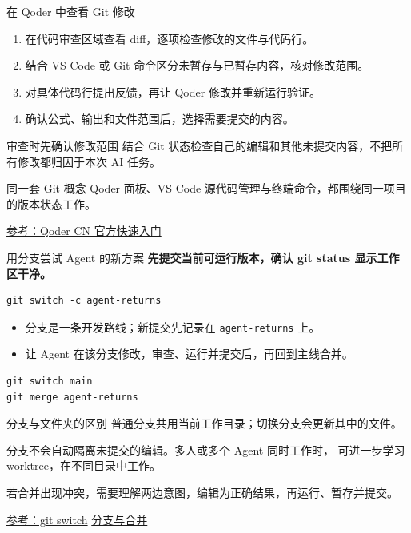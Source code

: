 \documentclass[9pt]{ctexbeamer}
\begin{document}
\begin{frame}{在 Qoder 中查看 Git 修改}
  \begin{enumerate}
    \item 在代码审查区域查看 diff，逐项检查修改的文件与代码行。
    \item 结合 VS Code 或 Git 命令区分未暂存与已暂存内容，核对修改范围。
    \item 对具体代码行提出反馈，再让 Qoder 修改并重新运行验证。
    \item 确认公式、输出和文件范围后，选择需要提交的内容。
  \end{enumerate}
  \begin{block}{审查时先确认修改范围}
    结合 Git 状态检查自己的编辑和其他未提交内容，不把所有修改都归因于本次 AI 任务。
  \end{block}
  \begin{block}{同一套 Git 概念}
    Qoder 面板、VS Code 源代码管理与终端命令，都围绕同一项目的版本状态工作。
  \end{block}
  {\tiny\href{https://docs.qoder.cn/qoder/quickstart}{参考：Qoder CN 官方快速入门}}
\end{frame}

\begin{frame}[fragile]{用分支尝试 Agent 的新方案}
  \textbf{先提交当前可运行版本，确认 git status 显示工作区干净。}
\begin{lstlisting}[language={},numbers=none]
git switch -c agent-returns
\end{lstlisting}
  \begin{itemize}
    \item 分支是一条开发路线；新提交先记录在 \texttt{agent-returns} 上。
    \item 让 Agent 在该分支修改，审查、运行并提交后，再回到主线合并。
  \end{itemize}
\begin{lstlisting}[language={},numbers=none]
git switch main
git merge agent-returns
\end{lstlisting}
  \begin{block}{分支与文件夹的区别}
    普通分支共用当前工作目录；切换分支会更新其中的文件。\par
    分支不会自动隔离未提交的编辑。多人或多个 Agent 同时工作时，
    可进一步学习 worktree，在不同目录中工作。
  \end{block}
  {\small 若合并出现冲突，需要理解两边意图，编辑为正确结果，再运行、暂存并提交。}
  \par{\tiny\href{https://git-scm.com/docs/git-switch}{参考：git switch}\quad
  \href{https://git-scm.com/docs/gittutorial}{分支与合并}}
\end{frame}
\end{document}
